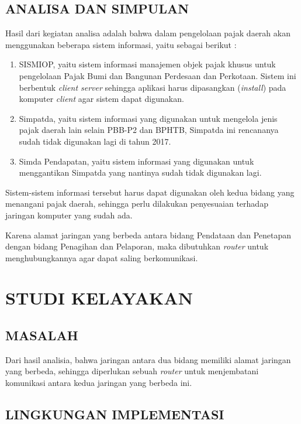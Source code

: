 \documentclass[pdftex,12pt, oneside]{article}
\begin{document}
\subsection{ANALISA DAN SIMPULAN}

Hasil dari kegiatan analisa adalah bahwa dalam pengelolaan pajak daerah akan menggunakan beberapa sistem informasi, yaitu sebagai berikut :

\begin{enumerate}[1.]
  \item SISMIOP, yaitu sistem informasi manajemen objek pajak khusus untuk pengelolaan Pajak Bumi dan Bangunan Perdesaan dan Perkotaan. Sistem ini berbentuk \textit{client server} sehingga aplikasi harus dipasangkan (\textit{install}) pada komputer \textit{client} agar sistem dapat digunakan.
  
  \item Simpatda, yaitu sistem informasi yang digunakan untuk mengelola jenis pajak daerah lain selain PBB-P2 dan BPHTB, Simpatda ini rencananya sudah tidak digunakan lagi di tahun 2017.
  
  \item Simda Pendapatan, yaitu sistem informasi yang digunakan untuk menggantikan Simpatda yang nantinya sudah tidak digunakan lagi.
\end{enumerate}

Sistem-sistem informasi tersebut harus dapat digunakan oleh kedua bidang yang menangani pajak daerah, sehingga perlu dilakukan penyesuaian terhadap jaringan komputer yang sudah ada.

Karena alamat jaringan yang berbeda antara bidang Pendataan dan Penetapan dengan bidang Penagihan dan Pelaporan, maka dibutuhkan \textit{router} untuk menghubungkannya agar dapat saling berkomunikasi.

\section{STUDI KELAYAKAN}

\subsection{MASALAH}

Dari hasil analisia, bahwa jaringan antara dua bidang memiliki alamat jaringan yang berbeda, sehingga diperlukan sebuah \textit{router} untuk menjembatani komunikasi antara kedua jaringan yang berbeda ini.

\subsection{LINGKUNGAN IMPLEMENTASI}
\end{document}
